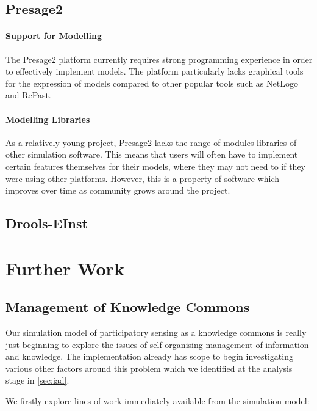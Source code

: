 \subsection{Presage2}

\paragraph{Support for Modelling} The Presage2 platform currently requires
strong programming experience in order to effectively implement models. The
platform particularly lacks graphical tools for the expression of models
compared to other popular tools such as NetLogo and RePast.

\paragraph{Modelling Libraries} As a relatively young project, Presage2 lacks
the range of modules libraries of other simulation software. This means that
users will often have to implement certain features themselves for their
models, where they may not need to if they were using other platforms.
However, this is a property of software which improves over time as community
grows around the project.

\subsection{Drools-EInst}



\section{Further Work}

\subsection{Management of Knowledge Commons}

Our simulation model of participatory sensing as a knowledge commons is really
just beginning to explore the issues of self-organising management of
information and knowledge. The implementation already has scope to begin
investigating various other factors around this problem which we identified at
the analysis stage in \autoref{sec:iad}.

We firstly explore lines of work immediately available from the simulation model:

